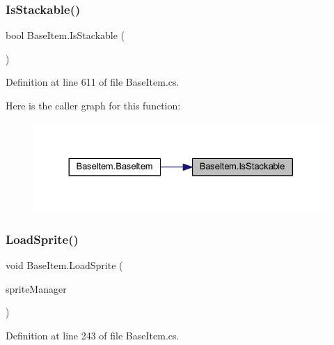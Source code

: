 \subsubsection{\texorpdfstring{IsStackable()}{IsStackable()}}
{\footnotesize\ttfamily bool Base\+Item.\+Is\+Stackable (\begin{DoxyParamCaption}{ }\end{DoxyParamCaption})}



Definition at line 611 of file Base\+Item.\+cs.

Here is the caller graph for this function\+:
\nopagebreak
\begin{figure}[H]
\begin{center}
\leavevmode
\includegraphics[width=330pt]{class_base_item_ad59a505bcfb8a026519ca912d0c1d8d3_icgraph}
\end{center}
\end{figure}
\mbox{\label{class_base_item_abedb8e41aaa0f3ee702ae8fa678204e2}} 
\subsubsection{\texorpdfstring{LoadSprite()}{LoadSprite()}}
{\footnotesize\ttfamily void Base\+Item.\+Load\+Sprite (\begin{DoxyParamCaption}\item[{\mbox{\hyperlink{class_sprite_manager}{Sprite\+Manager}}}]{sprite\+Manager }\end{DoxyParamCaption})}



Definition at line 243 of file Base\+Item.\+cs.

